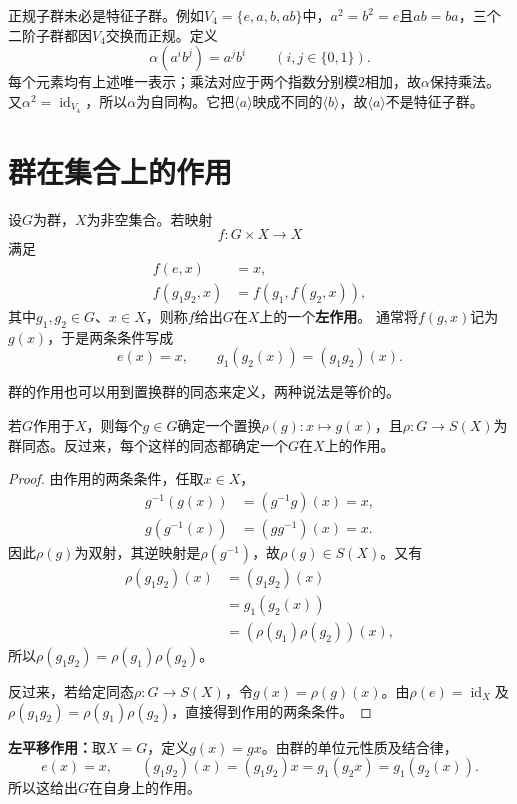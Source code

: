 正规子群未必是特征子群。例如$V_4=\{e,a,b,ab\}$中，$a^2=b^2=e$且$ab=ba$，三个二阶子群都因$V_4$交换而正规。定义
\[
\alpha(a^ib^j)=a^jb^i\qquad(i,j\in\{0,1\}).
\]
每个元素均有上述唯一表示；乘法对应于两个指数分别模2相加，故$\alpha$保持乘法。又$\alpha^2=\operatorname{id}_{V_4}$，所以$\alpha$为自同构。它把$\langle a\rangle$映成不同的$\langle b\rangle$，故$\langle a\rangle$不是特征子群。

\section{群在集合上的作用}


\begin{definition}
\label{p2:concept:c2-l924}设$G$为群，$X$为非空集合。若映射
\[
f:G\times X\longrightarrow X
\]
满足
\begin{align*}
f(e,x)&=x,\\
f(g_1g_2,x)&=f(g_1,f(g_2,x)),
\end{align*}
其中$g_1,g_2\in G$、$x\in X$，则称$f$给出$G$在$X$上的一个\textbf{左作用}。
通常将$f(g,x)$记为$g(x)$，于是两条条件写成
\[
e(x)=x,\qquad g_1(g_2(x))=(g_1g_2)(x).
\]
\end{definition}

群的作用也可以用到置换群的同态来定义，两种说法是等价的。

\begin{proposition}
若$G$作用于$X$，则每个$g\in G$确定一个置换$\rho(g):x\mapsto g(x)$，且$\rho:G\to S(X)$为群同态。反过来，每个这样的同态都确定一个$G$在$X$上的作用。
\end{proposition}
\begin{proof}
由作用的两条条件，任取$x\in X$，
\begin{align*}
g^{-1}(g(x))&=(g^{-1}g)(x)=x,\\
g(g^{-1}(x))&=(gg^{-1})(x)=x.
\end{align*}
因此$\rho(g)$为双射，其逆映射是$\rho(g^{-1})$，故$\rho(g)\in S(X)$。又有
\begin{align*}
\rho(g_1g_2)(x)&=(g_1g_2)(x)\\
&=g_1(g_2(x))\\
&=(\rho(g_1)\rho(g_2))(x),
\end{align*}
所以$\rho(g_1g_2)=\rho(g_1)\rho(g_2)$。

反过来，若给定同态$\rho:G\to S(X)$，令$g(x)=\rho(g)(x)$。由$\rho(e)=\operatorname{id}_X$及$\rho(g_1g_2)=\rho(g_1)\rho(g_2)$，直接得到作用的两条条件。
\end{proof}

\begin{example}
\label{p2:concept:c2-l963}\textbf{左平移作用：}取$X=G$，定义$g(x)=gx$。由群的单位元性质及结合律，
\[
e(x)=x,\qquad(g_1g_2)(x)=(g_1g_2)x=g_1(g_2x)=g_1(g_2(x)).
\]
所以这给出$G$在自身上的作用。
\end{example}

